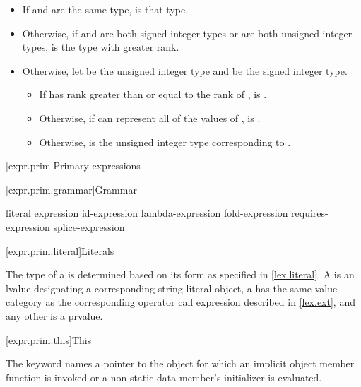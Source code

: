 \begin{itemize}
\begin{itemize}
\item If  and  are the same type,  is that type.

\item Otherwise, if  and  are both signed integer types or
are both unsigned integer types,
 is the type with greater rank.

\item Otherwise, let  be the unsigned integer type and
 be the signed integer type.
\begin{itemize}
\item If  has rank greater than or equal to the rank of ,
 is .
\item Otherwise, if  can represent all of the values of ,
 is .
\item Otherwise,
 is the unsigned integer type corresponding to .
\end{itemize}
\end{itemize}
\end{itemize}

[expr.prim]{Primary expressions}%

[expr.prim.grammar]{Grammar}

\begin{bnf}
\br
    literal\br
    \br
    \terminal{(} expression \terminal{)}\br
    id-expression\br
    lambda-expression\br
    fold-expression\br
    requires-expression\br
    splice-expression
\end{bnf}

[expr.prim.literal]{Literals}

\pnum
{}%
%
The type of a 
is determined based on its form as specified in \ref{lex.literal}.
A  is an lvalue
designating a corresponding string literal object,
a 
has the same value category
as the corresponding operator call expression described in \ref{lex.ext},
and any other  is a prvalue.

[expr.prim.this]{This}

\pnum
{}%
The keyword  names a pointer to the object for which an implicit object member
function is invoked or a non-static data member's
initializer is evaluated.

